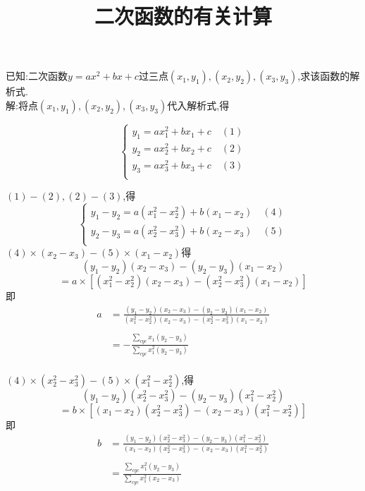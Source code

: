 \documentclass[UTF8]{ctexart}
\title{二次函数的有关计算}
\author{}
\begin{document}
\maketitle
\begin{flushleft}
已知:二次函数$y=ax^{2}+bx+c$过三点$(x_{1},y_{1}),(x_{2},y_{2}),(x_{3},y_{3})$,求该函数的解析式.\\
解:将点$(x_{1},y_{1}),(x_{2},y_{2}),(x_{3},y_{3})$代入解析式,得
\end{flushleft}
\[
\begin{cases}
y_{1}=ax_{1}^{2}+bx_{1}+c\quad (1)\\
y_{2}=ax_{2}^{2}+bx_{2}+c\quad (2)\\
y_{3}=ax_{3}^{2}+bx_{3}+c\quad (3)\\
\end{cases}
\]

$(1)-(2),(2)-(3)$,得\\
\[
\begin{cases}
y_{1}-y_{2}=a(x_{1}^{2}-x_{2}^{2})+b(x_{1}-x_{2})\quad (4)\\
y_{2}-y_{3}=a(x_{2}^{2}-x_{3}^{2})+b(x_{2}-x_{3})\quad (5)\\
\end{cases}
\]
$(4)\times (x_{2}-x_{3})-(5)\times (x_{1}-x_{2})$得
\[(y_{1}-y_{2})(x_{2}-x_{3})-(y_{2}-y_{3})(x_{1}-x_{2})\]
\[=a\times [(x_{1}^{2}-x_{2}^{2})(x_{2}-x_{3})-(x_{2}^{2}-x_{3}^{2})(x_{1}-x_{2})]\]
即
\[
\begin{aligned}
a&=\frac{(y_{1}-y_{2})(x_{2}-x_{3})-(y_{2}-y_{3})(x_{1}-x_{2})}{(x_{1}^{2}-x_{2}^{2})(x_{2}-x_{3})-(x_{2}^{2}-x_{3}^{2})(x_{1}-x_{2})}\\
& \\
&=-\frac{\sum\limits_{cyc}x_{1}(y_{2}-y_{3})}{\sum\limits_{cyc}x_{1}^{2}(y_{2}-y_{3})}\\
\end{aligned}
\]
 
$(4)\times (x_{2}^{2}-x_{3}^{2})-(5)\times (x_{1}^{2}-x_{2}^{2})$,得
\[(y_{1}-y_{2})(x_{2}^{2}-x_{3}^{2})-(y_{2}-y_{3})(x_{1}^{2}-x_{2}^{2})\]
\[=b \times [(x_{1}-x_{2})(x_{2}^{2}-x_{3}^{2})-(x_{2}-x_{3})(x_{1}^{2}-x_{2}^{2})]\]
即
\[
\begin{aligned}
b&=\frac{(y_{1}-y_{2})(x_{2}^{2}-x_{3}^{2})-(y_{2}-y_{3})(x_{1}^{2}-x_{2}^{2})}{(x_{1}-x_{2})(x_{2}^{2}-x_{3}^{2})-(x_{2}-x_{3})(x_{1}^{2}-x_{2}^{2})}\\
& \\
&=\frac{\sum\limits_{cyc}x_{1}^{2}(y_{2}-y_{3})}{\sum\limits_{cyc}x_{1}^{2}(x_{2}-x_{3})}\\
\end{aligned}
\]
\end{document}

